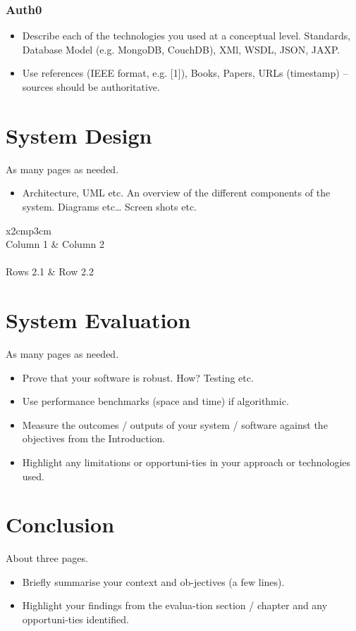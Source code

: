 \subsection{Auth0}





\begin{itemize}
\item Describe each of the technologies you used at a conceptual level. Standards, Database Model (e.g. MongoDB, CouchDB), XMl, WSDL, JSON, JAXP.
\item Use references (IEEE format, e.g. [1]), Books, Papers, URLs (timestamp) – sources should be authoritative. 
\end{itemize}



\chapter{System Design}
As many pages as needed.
\begin{itemize}
\item Architecture, UML etc. An overview of the different components of the system. Diagrams etc… Screen shots etc.
\end{itemize}

\begin{table}[h]
  \centering
  \begin{tabular}{x{2cm}p{3cm}}
    \toprule \\
    Column 1 & Column 2 \\
    \midrule \\
    Rows 2.1 & Row 2.2 \\
    \bottomrule
  \end{tabular}
  \caption{A table.}
  \label{table:mytable}
\end{table}

\chapter{System Evaluation}
As many pages as needed.
\begin{itemize}
\item Prove that your software is robust. How? Testing etc. 
\item Use performance benchmarks (space and time) if algorithmic.
\item Measure the outcomes / outputs of your system / software against the objectives from the Introduction.
\item Highlight any limitations or opportuni-ties in your approach or technologies used.
\end{itemize}

\chapter{Conclusion}
About three pages.

\begin{itemize}
\item Briefly summarise your context and ob-jectives (a few lines).
\item Highlight your findings from the evalua-tion section / chapter and any opportuni-ties identified.
\end{itemize}

